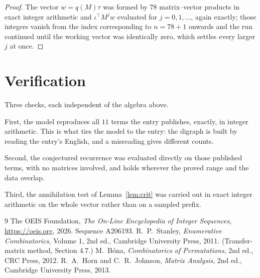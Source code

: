 \documentclass[11pt,a4paper]{article}
\theoremstyle{plain}
\theoremstyle{definition}
\begin{document}
\begin{proof}
The vector $w=q(M)\tau$ was formed by $78$ matrix--vector products in exact integer
arithmetic and $\iota^{\!\top}M^{j}w$ evaluated for $j=0,1,\dots$, again exactly; those
integers vanish from the index corresponding to $n=78+1$ onwards and the run continued
until the working vector was identically zero, which settles every larger $j$ at once.
\end{proof}

\section{Verification}

Three checks, each independent of the algebra above.

First, the model reproduces all $11$ terms the entry publishes, exactly, in integer
arithmetic. This is what ties the model to the entry: the digraph is built by reading the
entry's English, and a misreading gives different counts.

Second, the conjectured recurrence was evaluated directly on those published terms, with no
matrices involved, and holds wherever the proved range and the data overlap.

Third, the annihilation test of Lemma~\ref{lem:crit} was carried out in exact integer
arithmetic on the whole vector rather than on a sampled prefix.

\begin{thebibliography}{9}
 The OEIS Foundation, \emph{The On-Line Encyclopedia of Integer
Sequences}, \url{https://oeis.org}, 2026. Sequence A206193.
 R.~P.~Stanley, \emph{Enumerative Combinatorics}, Volume 1, 2nd ed.,
Cambridge University Press, 2011. (Transfer-matrix method, Section 4.7.)
 M.~B\'ona, \emph{Combinatorics of Permutations}, 2nd ed., CRC
Press, 2012.
 R.~A.~Horn and C.~R.~Johnson, \emph{Matrix Analysis}, 2nd ed., Cambridge
University Press, 2013.
\end{thebibliography}
\end{document}
